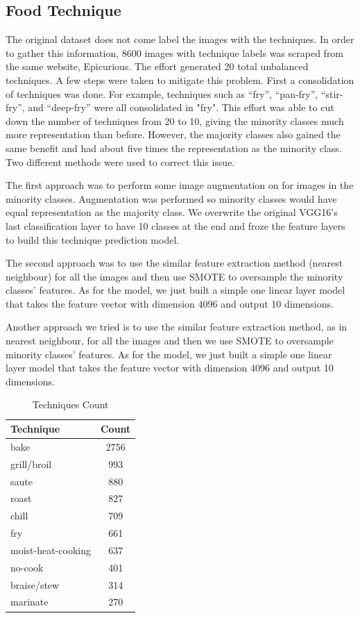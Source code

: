 \documentclass[10pt,twocolumn,letterpaper]{article}
\begin{document}
\subsection{Food Technique}
The original dataset does not come label the images with the techniques. In order to gather this information, 8600 images with technique labels was scraped from the same website, Epicurious. The effort generated 20 total unbalanced techniques. A few steps were taken to mitigate this problem. First a consolidation of techniques was done. For example, techniques such as “fry”, “pan-fry”, “stir-fry”, and “deep-fry” were all consolidated in "fry". This effort was able to cut down the number of techniques from 20 to 10, giving the minority classes much more representation than before. However, the majority classes also gained the same benefit and had about five times the representation as the minority class. Two different methods were used to correct this issue. 

The first approach was to perform some image augmentation on for images in the minority classes. Augmentation was performed so minority classes would have equal representation as the majority class. We overwrite the original VGG16’s last classification layer to have 10 classes at the end and froze the feature layers to build this technique prediction model.

The second approach was to use the similar feature extraction method (nearest neighbour) for all the images and then use SMOTE\cite{Authors02} to oversample the minority classes' features. As for the model, we just built a simple one linear layer model that takes the feature vector with dimension 4096 and output 10 dimensions.

Another approach we tried is to use the similar feature extraction method, as in nearest neighbour, for all the images and then we use SMOTE \cite{Authors02} to oversample minority classes’ features. As for the model, we just built a simple one linear layer model that takes the feature vector with dimension 4096 and output 10 dimensions.
\begin{table}
\begin{center}
\begin{tabular}{|l|c|}
\hline
Technique & Count \\
\hline\hline
bake & 2756 \\
grill/broil &  993 \\
saute &  880 \\
roast &  827 \\
chill &  709 \\
fry &  661 \\
moist-heat-cooking &  637 \\
no-cook &  401 \\
braise/stew &  314 \\
marinate &  270 \\
\hline
\end{tabular}
\end{center}
\caption{Techniques Count}
\label{tab:techniques_count}
\end{table}
\end{document}
